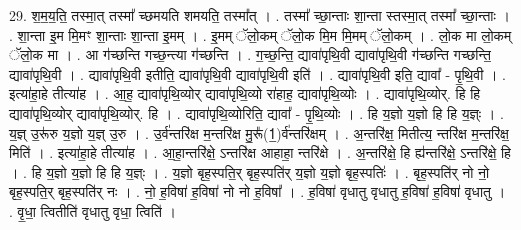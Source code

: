 \documentclass[17pt]{extarticle}
\begin{document}
29. श॒म॒य॒ति॒ तस्मा॒त् तस्मा᳚ च्छमयति शमयति॒ तस्मा᳚त् । . तस्मा᳚ च्छा॒न्ताः शा॒न्ता स्तस्मा॒त् तस्मा᳚ च्छा॒न्ताः । . शा॒न्ता इ॒म मि॒मꣳ शा॒न्ताः शा॒न्ता इ॒मम् । . इ॒मम् ॅलो॒कम् ॅलो॒क मि॒म मि॒मम् ॅलो॒कम् । . लो॒क मा लो॒कम् ॅलो॒क मा । . आ ग॑च्छन्ति गच्छ॒न्त्या ग॑च्छन्ति । . ग॒च्छ॒न्ति॒ द्यावा॑पृथि॒वी द्यावा॑पृथि॒वी ग॑च्छन्ति गच्छन्ति॒ द्यावा॑पृथि॒वी । . द्यावा॑पृथि॒वी इतीति॒ द्यावा॑पृथि॒वी द्यावा॑पृथि॒वी इति॑ । . द्यावा॑पृथि॒वी इति॒ द्यावा᳚ - पृ॒थि॒वी । . इत्या॑हा॒हे तीत्या॑ह । . आ॒ह॒ द्यावा॑पृथि॒व्योर् द्यावा॑पृथि॒व्यो रा॑हाह॒ द्यावा॑पृथि॒व्योः । . द्यावा॑पृथि॒व्योर्. हि हि द्यावा॑पृथि॒व्योर् द्यावा॑पृथि॒व्योर्. हि । . द्यावा॑पृथि॒व्योरिति॒ द्यावा᳚ - पृ॒थि॒व्योः । . हि य॒ज्ञो य॒ज्ञो हि हि य॒ज्ञ्ः । . य॒ज्ञ् उ॒रू॑रु य॒ज्ञो य॒ज्ञ् उ॒रु । . उ॒र्व॑न्तरि॑क्ष म॒न्तरि॑क्ष मु॒रू᳚(1॒)र्व॑न्तरि॑क्षम् । . अ॒न्तरि॑क्ष॒ मितीत्य॒ न्तरि॑क्ष म॒न्तरि॑क्ष॒ मिति॑ । . इत्या॑हा॒हे तीत्या॑ह । . आ॒हा॒न्तरि॑क्षे॒ ऽन्तरि॑क्ष आहाहा॒ न्तरि॑क्षे । . अ॒न्तरि॑क्षे॒ हि ह्य॑न्तरि॑क्षे॒ ऽन्तरि॑क्षे॒ हि । . हि य॒ज्ञो य॒ज्ञो हि हि य॒ज्ञ्ः । . य॒ज्ञो बृह॒स्पति॒र् बृह॒स्पति॑र् य॒ज्ञो य॒ज्ञो बृह॒स्पतिः॑ । . बृह॒स्पति॑र् नो नो॒ बृह॒स्पति॒र् बृह॒स्पति॑र् नः । . नो॒ ह॒विषा॑ ह॒विषा॑ नो नो ह॒विषा᳚ । . ह॒विषा॑ वृधातु वृधातु ह॒विषा॑ ह॒विषा॑ वृधातु । . वृ॒धा॒ त्वितीति॑ वृधातु वृधा॒ त्विति॑ । \newline
\end{document}
